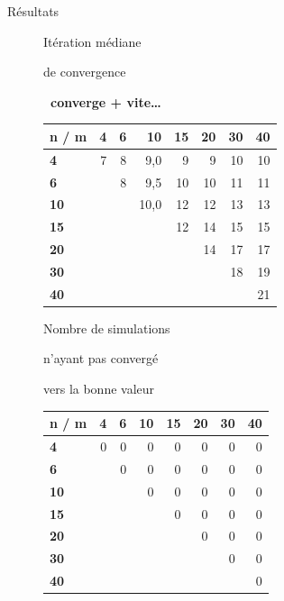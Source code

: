 \documentclass[10pt,xcolor=table,color={dvipsnames,usenames},ignorenonframetext,usepdftitle=false,french]{beamer}
\begin{document}
\begin{frame}{Résultats}
\protect\hypertarget{ruxe9sultats-2}{}

\tiny
\begin{figure}
\begin{minipage}{.4\textwidth}
\normalsize{Itération médiane

de convergence

\faArrowCircleRight \textbf{\ converge + vite\dots}
}
\end{minipage}%
\begin{minipage}{.6\textwidth}

\begin{tabular}{>{\bfseries}l|r|r|r|r|r|r|r}
\hline
\textbf{n / m } & \textbf{4} & \textbf{6} & \textbf{10} & \textbf{15} & \textbf{20} & \textbf{30} & \textbf{40}\\
\hline
4 & 7 & 8 & 9,0 & 9 & 9 & 10 & 10\\
\hline
6 &  & 8 & 9,5 & 10 & 10 & 11 & 11\\
\hline
10 &  &  & 10,0 & 12 & 12 & 13 & 13\\
\hline
15 &  &  &  & 12 & 14 & 15 & 15\\
\hline
20 &  &  &  &  & 14 & 17 & 17\\
\hline
30 &  &  &  &  &  & 18 & 19\\
\hline
40 &  &  &  &  &  &  & 21\\
\hline
\end{tabular}
\end{minipage}
\end{figure}

\begin{figure}
\begin{minipage}{.4\textwidth}
\normalsize{Nombre de simulations

n'ayant pas convergé

vers la bonne valeur}
\end{minipage}%
\begin{minipage}{.6\textwidth}

\begin{tabular}{>{\bfseries}l|r|r|r|r|r|r|r}
\hline
\textbf{n / m } & \textbf{4} & \textbf{6} & \textbf{10} & \textbf{15} & \textbf{20} & \textbf{30} & \textbf{40}\\
\hline
4 & 0 & 0 & 0 & 0 & 0 & 0 & 0\\
\hline
6 &  & 0 & 0 & 0 & 0 & 0 & 0\\
\hline
10 &  &  & 0 & 0 & 0 & 0 & 0\\
\hline
15 &  &  &  & 0 & 0 & 0 & 0\\
\hline
20 &  &  &  &  & 0 & 0 & 0\\
\hline
30 &  &  &  &  &  & 0 & 0\\
\hline
40 &  &  &  &  &  &  & 0\\
\hline
\end{tabular}
\end{minipage}
\end{figure}


\end{frame}
\end{document}
